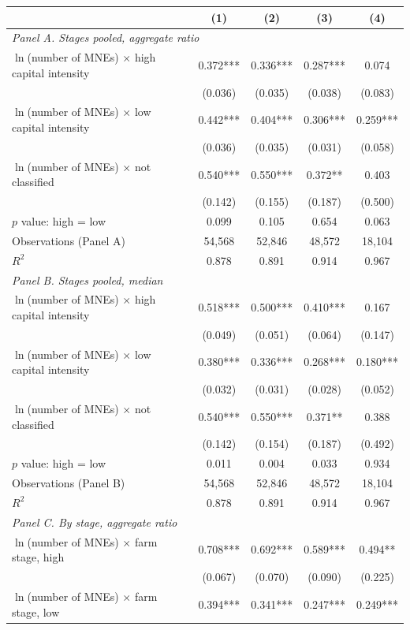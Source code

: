 \begin{tabular}{l*{4}{c}}
\toprule
 & (1) & (2) & (3) & (4) \\
\midrule
\multicolumn{5}{l}{\textit{Panel A. Stages pooled, aggregate ratio}} \\
$\ln$(number of MNEs) $\times$ high capital intensity & 0.372*** & 0.336*** & 0.287*** & 0.074 \\
 & (0.036) & (0.035) & (0.038) & (0.083) \\
$\ln$(number of MNEs) $\times$ low capital intensity & 0.442*** & 0.404*** & 0.306*** & 0.259*** \\
 & (0.036) & (0.035) & (0.031) & (0.058) \\
$\ln$(number of MNEs) $\times$ not classified & 0.540*** & 0.550*** & 0.372** & 0.403 \\
 & (0.142) & (0.155) & (0.187) & (0.500) \\
$p$ value: high = low & 0.099 & 0.105 & 0.654 & 0.063 \\
Observations (Panel A) & 54,568 & 52,846 & 48,572 & 18,104 \\
$R^2$ & 0.878 & 0.891 & 0.914 & 0.967 \\
\midrule
\multicolumn{5}{l}{\textit{Panel B. Stages pooled, median}} \\
$\ln$(number of MNEs) $\times$ high capital intensity & 0.518*** & 0.500*** & 0.410*** & 0.167 \\
 & (0.049) & (0.051) & (0.064) & (0.147) \\
$\ln$(number of MNEs) $\times$ low capital intensity & 0.380*** & 0.336*** & 0.268*** & 0.180*** \\
 & (0.032) & (0.031) & (0.028) & (0.052) \\
$\ln$(number of MNEs) $\times$ not classified & 0.540*** & 0.550*** & 0.371** & 0.388 \\
 & (0.142) & (0.154) & (0.187) & (0.492) \\
$p$ value: high = low & 0.011 & 0.004 & 0.033 & 0.934 \\
Observations (Panel B) & 54,568 & 52,846 & 48,572 & 18,104 \\
$R^2$ & 0.878 & 0.891 & 0.914 & 0.967 \\
\midrule
\multicolumn{5}{l}{\textit{Panel C. By stage, aggregate ratio}} \\
$\ln$(number of MNEs) $\times$ farm stage, high & 0.708*** & 0.692*** & 0.589*** & 0.494** \\
 & (0.067) & (0.070) & (0.090) & (0.225) \\
$\ln$(number of MNEs) $\times$ farm stage, low & 0.394*** & 0.341*** & 0.247*** & 0.249*** \\

\end{tabular}
